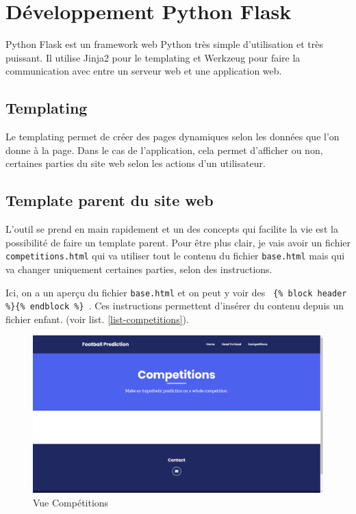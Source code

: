 \documentclass[a4paper,14pt]{extarticle}
\begin{document}
{\section{Développement Python Flask}

Python Flask est un framework web Python très simple d'utilisation et très puissant. Il utilise Jinja2 pour le templating et Werkzeug pour faire la communication avec entre un serveur web et une application web. 

\subsection{Templating}

Le templating permet de créer des pages dynamiques selon les données que l'on donne à la page. Dans le cas de l'application, cela permet d'afficher ou non, certaines parties du site web selon les actions d'un utilisateur.

\subsection{Template parent du site web}

L'outil se prend en main rapidement et un des concepts qui facilite la vie est la possibilité de faire un template parent. Pour être plus clair, je vais avoir un fichier \texttt{competitions.html} qui va utiliser tout le contenu du fichier \texttt{base.html} mais qui va changer uniquement certaines parties, selon des instructions.

Ici, on a un aperçu du fichier \texttt{base.html} et on peut y voir des \texttt{ \{\% block header \%\}\{\% endblock \%\} }. Ces instructions permettent d'insérer du contenu depuis un fichier enfant. (voir list.  \ref{list-competitions}).



\begin{figure}[htp]
    \centering
    \includegraphics[width=15cm]{../img/apercuVueCompetitions.png}
    \caption{Vue Compétitions}
    \label{fig:vueCompetitions}
\end{figure}

}
\end{document}
